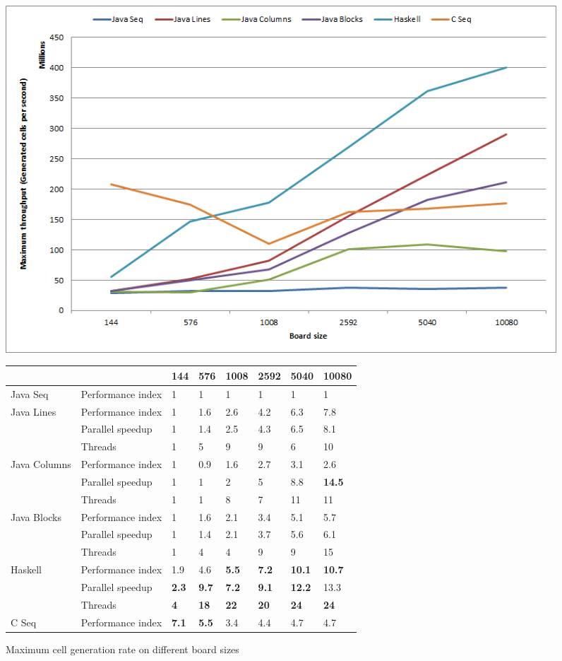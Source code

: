 \documentclass[a4paper]{article}
\begin{document}
    \begin{figure}[h]
        \centering
        \includegraphics[width=0.7\linewidth]{results/board_size_impact.png}

        \begin{tabular}{  ll | l  l  l  l  l  l }
            & & 144 & 576 & 1008 & 2592 & 5040 & 10080 \\ \hline

            Java Seq & Performance index & 1 & 1 & 1 & 1 & 1 & 1 \\
            Java Lines
                & Performance index & 1 & 1.6 & 2.6 & 4.2 & 6.3 & 7.8 \\
                & Parallel speedup  & 1 & 1.4 & 2.5 & 4.3 & 6.5 & 8.1 \\
                & Threads           & 1 & 5   & 9   & 9   & 6   & 10 \\
            Java Columns
                & Performance index & 1 & 0.9 & 1.6 & 2.7 & 3.1 & 2.6 \\
                & Parallel speedup  & 1 & 1   & 2   & 5   & 8.8 
                                    & \textbf{14.5} \\
                & Threads           & 1 & 1   & 8   & 7   & 11  & 11 \\
            Java Blocks
                & Performance index & 1 & 1.6 & 2.1 & 3.4
                                    & 5.1 & 5.7 \\
                & Parallel speedup  & 1 & 1.4 & 2.1 & 3.7
                                    & 5.6 & 6.1 \\
                & Threads           & 1 & 4   & 4   & 9
                                    & 9 & 15 \\
            Haskell
                & Performance index & 1.9 & 4.6
                                    & \textbf{5.5}  & \textbf{7.2}
                                    & \textbf{10.1} & \textbf{10.7} \\
                & Parallel speedup  & \textbf{2.3}  & \textbf{9.7}
                                    & \textbf{7.2}  & \textbf{9.1}
                                    & \textbf{12.2} & 13.3 \\
                & Threads           & \textbf{4}    & \textbf{18}
                                    & \textbf{22}   & \textbf{20}
                                    & \textbf{24}   & \textbf{24} \\
            C Seq & Performance index & \textbf{7.1} & \textbf{5.5}
                                      & 3.4 & 4.4 & 4.7 & 4.7 \\
        \end{tabular}

        \caption{
            Maximum cell generation rate on different board sizes
            \label{fig:board_size_impact}
        }
    \end{figure}
\end{document}
